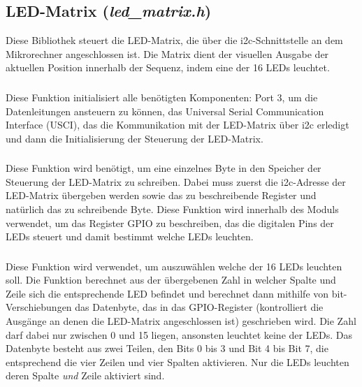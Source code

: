 \subsection{LED-Matrix (\textsl{led\_matrix.h})}
Diese Bibliothek steuert die LED-Matrix, die über die i2c-Schnittstelle an dem Mikrorechner angeschlossen ist. Die Matrix dient der visuellen Ausgabe der aktuellen Position innerhalb der Sequenz, indem eine der 16 LEDs leuchtet.

\subsubsection{}
Diese Funktion initialisiert alle benötigten Komponenten: Port 3, um die Datenleitungen ansteuern zu können, das Universal Serial Communication Interface (USCI), das die Kommunikation mit der LED-Matrix über i2c erledigt und dann die Initialisierung der Steuerung der LED-Matrix.

\subsubsection{}
Diese Funktion wird benötigt, um eine einzelnes Byte in den Speicher der Steuerung der LED-Matrix zu schreiben. Dabei muss zuerst die i2c-Adresse der LED-Matrix übergeben werden sowie das zu beschreibende Register und natürlich das zu schreibende Byte. Diese Funktion wird innerhalb des Moduls verwendet, um das Register GPIO zu beschreiben, das die digitalen Pins der LEDs steuert und damit bestimmt welche LEDs leuchten.

\subsubsection{}
Diese Funktion wird verwendet, um auszuwählen welche der 16 LEDs leuchten soll. Die Funktion berechnet aus der übergebenen Zahl in welcher Spalte und Zeile sich die entsprechende LED befindet und berechnet dann mithilfe von bit-Verschiebungen das Datenbyte, das in das GPIO-Register (kontrolliert die Ausgänge an denen die LED-Matrix angeschlossen ist) geschrieben wird. Die Zahl darf dabei nur zwischen 0 und 15 liegen, ansonsten leuchtet keine der LEDs. Das Datenbyte besteht aus zwei Teilen, den Bits 0 bis 3 und Bit 4 bis Bit 7, die entsprechend die vier Zeilen und vier Spalten aktivieren. Nur die LEDs leuchten deren Spalte \emph{und} Zeile aktiviert sind.
